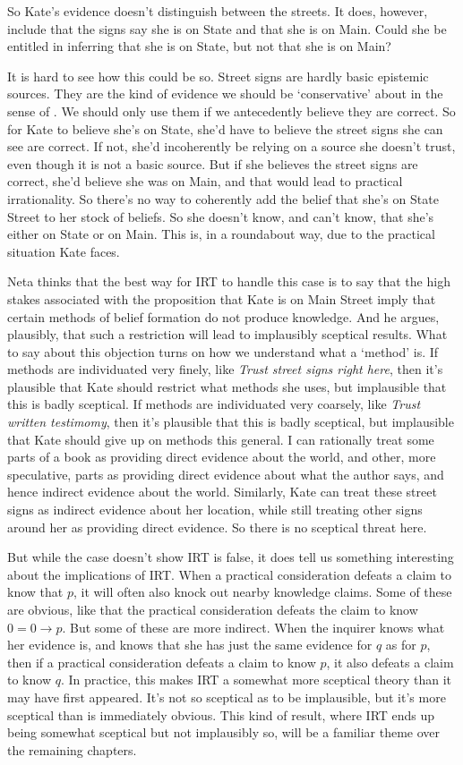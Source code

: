 \documentclass[11pt,]{book}
\begin{document}
So Kate's evidence doesn't distinguish between the streets. It does, however, include that the signs say she is on State and that she is on Main. Could she be entitled in inferring that she is on State, but not that she is on Main?

It is hard to see how this could be so. Street signs are hardly basic epistemic sources. They are the kind of evidence we should be `conservative' about in the sense of \citet{Pryor2004}. We should only use them if we antecedently believe they are correct. So for Kate to believe she's on State, she'd have to believe the street signs she can see are correct. If not, she'd incoherently be relying on a source she doesn't trust, even though it is not a basic source. But if she believes the street signs are correct, she'd believe she was on Main, and that would lead to practical irrationality. So there's no way to coherently add the belief that she's
on State Street to her stock of beliefs. So she doesn't know, and can't know, that she's either on State or on Main. This is, in a roundabout way, due to the practical situation Kate faces.

Neta thinks that the best way for IRT to handle this case is to say that the high stakes associated with the proposition that Kate is on Main Street imply that certain methods of belief formation do not produce knowledge. And he argues, plausibly, that such a restriction will lead to implausibly sceptical results. What to say about this objection turns on how we understand what a `method' is. If methods are individuated very finely, like \emph{Trust street signs right here}, then it's plausible that Kate should restrict what methods she uses, but implausible that this is badly sceptical. If methods are individuated very coarsely, like \emph{Trust written testimomy}, then it's plausible that this is badly sceptical, but implausible that Kate should give up on methods this general. I can rationally treat some parts of a book as providing direct evidence about the world, and other, more speculative, parts as providing direct evidence about what the author says, and hence indirect evidence about the world. Similarly, Kate can treat these street signs as indirect evidence about her location, while still treating other signs around her as providing direct evidence. So there is no sceptical threat here.

But while the case doesn't show IRT is false, it does tell us something interesting about the implications of IRT. When a practical consideration defeats a claim to know that \(p\), it will often also knock out nearby knowledge claims. Some of these are obvious, like that the practical consideration defeats the claim to know \(0=0 \rightarrow p\). But some of these are more indirect. When the inquirer knows what her evidence is, and knows that she has just the same evidence for \(q\) as for \(p\), then if a practical consideration defeats a claim to know \(p\), it also defeats a claim to know \(q\). In practice, this makes IRT a somewhat more sceptical theory than it may have first appeared. It's not so sceptical as to be implausible, but it's more sceptical than is immediately obvious. This kind of result, where IRT ends up being somewhat sceptical but not implausibly so, will be a familiar theme over the remaining chapters.
\end{document}
